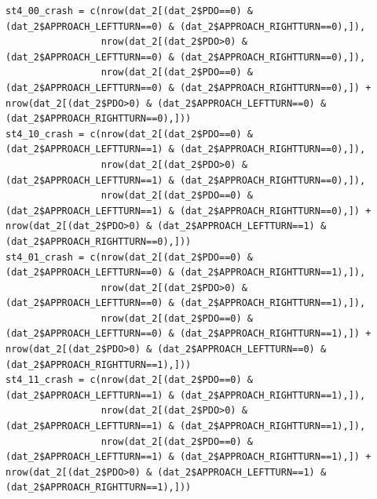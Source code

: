 \documentclass[11pt]{scrartcl} %
\begin{document}
\begin{lstlisting}
st4_00_crash = c(nrow(dat_2[(dat_2$PDO==0) & (dat_2$APPROACH_LEFTTURN==0) & (dat_2$APPROACH_RIGHTTURN==0),]),
                 nrow(dat_2[(dat_2$PDO>0) & (dat_2$APPROACH_LEFTTURN==0) & (dat_2$APPROACH_RIGHTTURN==0),]),
                 nrow(dat_2[(dat_2$PDO==0) & (dat_2$APPROACH_LEFTTURN==0) & (dat_2$APPROACH_RIGHTTURN==0),]) + nrow(dat_2[(dat_2$PDO>0) & (dat_2$APPROACH_LEFTTURN==0) & (dat_2$APPROACH_RIGHTTURN==0),]))
st4_10_crash = c(nrow(dat_2[(dat_2$PDO==0) & (dat_2$APPROACH_LEFTTURN==1) & (dat_2$APPROACH_RIGHTTURN==0),]),
                 nrow(dat_2[(dat_2$PDO>0) & (dat_2$APPROACH_LEFTTURN==1) & (dat_2$APPROACH_RIGHTTURN==0),]),
                 nrow(dat_2[(dat_2$PDO==0) & (dat_2$APPROACH_LEFTTURN==1) & (dat_2$APPROACH_RIGHTTURN==0),]) + nrow(dat_2[(dat_2$PDO>0) & (dat_2$APPROACH_LEFTTURN==1) & (dat_2$APPROACH_RIGHTTURN==0),]))
st4_01_crash = c(nrow(dat_2[(dat_2$PDO==0) & (dat_2$APPROACH_LEFTTURN==0) & (dat_2$APPROACH_RIGHTTURN==1),]),
                 nrow(dat_2[(dat_2$PDO>0) & (dat_2$APPROACH_LEFTTURN==0) & (dat_2$APPROACH_RIGHTTURN==1),]),
                 nrow(dat_2[(dat_2$PDO==0) & (dat_2$APPROACH_LEFTTURN==0) & (dat_2$APPROACH_RIGHTTURN==1),]) + nrow(dat_2[(dat_2$PDO>0) & (dat_2$APPROACH_LEFTTURN==0) & (dat_2$APPROACH_RIGHTTURN==1),]))
st4_11_crash = c(nrow(dat_2[(dat_2$PDO==0) & (dat_2$APPROACH_LEFTTURN==1) & (dat_2$APPROACH_RIGHTTURN==1),]),
                 nrow(dat_2[(dat_2$PDO>0) & (dat_2$APPROACH_LEFTTURN==1) & (dat_2$APPROACH_RIGHTTURN==1),]),
                 nrow(dat_2[(dat_2$PDO==0) & (dat_2$APPROACH_LEFTTURN==1) & (dat_2$APPROACH_RIGHTTURN==1),]) + nrow(dat_2[(dat_2$PDO>0) & (dat_2$APPROACH_LEFTTURN==1) & (dat_2$APPROACH_RIGHTTURN==1),]))


\end{lstlisting}
\end{document}
